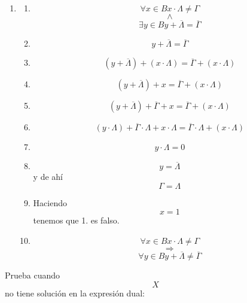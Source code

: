 \begin{enumerate}
\begin{enumerate}
\begin{enumerate}
\begin{enumerate}
\begin{enumerate}
          \begin{enumerate}
          \def\labelenumvi{\arabic{enumvi}.}
          \tightlist
          \item
            \begin{enumerate}
            \def\labelenumvii{\arabic{enumvii}.}
            \tightlist
            \item
              \[\forall{x \in B}{{x \cdot \Lambda} \neq \Gamma}\]\[\land\]\[\exists{y \in B}{{y + \overline{\Lambda}} = \overline{\Gamma}}\]
            \item
              \[{y + \overline{\Lambda}} = \overline{\Gamma}\]
            \item
              \[{\left( {y + \overline{\Lambda}} \right) + \left( {x \cdot \Lambda} \right)} = {\overline{\Gamma} + \left( {x \cdot \Lambda} \right)}\]
            \item
              \[{\left( {y + \overline{\Lambda}} \right) + x} = {\overline{\Gamma} + \left( {x \cdot \Lambda} \right)}\]
            \item
              \[{{\left( {y + \overline{\Lambda}} \right) + \overline{\Gamma}} + x} = {\overline{\Gamma} + \left( {x \cdot \Lambda} \right)}\]
            \item
              \[{{\left( {y \cdot \Lambda} \right) + {\overline{\Gamma} \cdot \Lambda}} + {x \cdot \Lambda}} = {{\overline{\Gamma} \cdot \Lambda} + \left( {x \cdot \Lambda} \right)}\]
            \item
              \[{y \cdot \Lambda} = 0\]
            \item
              \[y = \overline{\Lambda}\] y de ahí \[\Gamma = \Lambda\]
            \item
              Haciendo \[x = 1\] tenemos que 1. es falso.
            \item
              \[\forall{x \in B}{{x \cdot \Lambda} \neq \Gamma}\]\[\Rightarrow\]\[\forall{y \in B}{{y + \overline{\Lambda}} \neq \overline{\Gamma}}\]
            \end{enumerate}
          \end{enumerate}

          Prueba cuando \[X\] no tiene solución en la expresión dual:


\end{enumerate}
\end{enumerate}
\end{enumerate}
\end{enumerate}
\end{enumerate}
